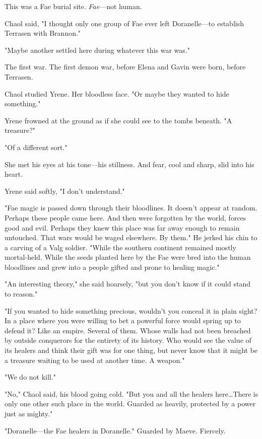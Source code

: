 This was a Fae burial site.
\emph{Fae}---not human.

Chaol said, "I thought only one group of Fae ever left Doranelle---to establish Terrasen with Brannon."

"Maybe another settled here during whatever this war was."

The first war.
The first demon war, before Elena and Gavin were born, before Terrasen.

Chaol studied Yrene.
Her bloodless face.
"Or maybe they wanted to hide something."

Yrene frowned at the ground as if she could see to the tombs beneath.
"A treasure?"

"Of a different sort."

She met his eyes at his tone---his stillness.
And fear, cool and sharp, slid into his heart.

Yrene said softly, "I don't understand."

"Fae magic is passed down through their bloodlines.
It doesn't appear at random.
Perhaps these people came here.
And then were forgotten by the world, forces good and evil.
Perhaps they knew this place was far away enough to remain untouched.
That wars would be waged elsewhere.
By them."
He jerked his chin to a carving of a Valg soldier.
"While the southern continent remained mostly mortal-held.
While the seeds planted here by the Fae were bred into the human bloodlines and grew into a people gifted and prone to healing magic."

"An interesting theory," she said hoarsely, "but you don't know if it could stand to reason."

"If you wanted to hide something precious, wouldn't you conceal it in plain sight?
In a place where you were willing to bet a powerful force would spring up to defend it?
Like an empire.
Several of them.
Whose walls had not been breached by outside conquerors for the entirety of its history.
Who would see the value of its healers and think their gift was for one thing, but never know that it might be a treasure waiting to be used at another time.
A weapon."

"We do not kill."

"No," Chaol said, his blood going cold.
"But you and all the healers here\ldots There is only one other such place in the world.
Guarded as heavily, protected by a power just as mighty."

"Doranelle---the Fae healers in Doranelle."
Guarded by Maeve.
Fiercely.

